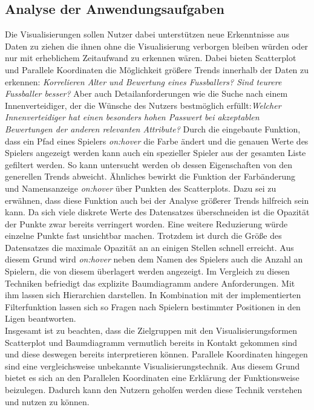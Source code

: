 \documentclass[usegeometry=true]{scrartcl}
\begin{document}
\subsection{Analyse der Anwendungsaufgaben}
Die Visualisierungen sollen Nutzer dabei unterstützen neue Erkenntnisse aus Daten zu ziehen die ihnen ohne die Visualisierung verborgen bleiben würden oder nur mit erheblichem Zeitaufwand zu erkennen wären.
Dabei bieten Scatterplot und Parallele Koordinaten die Möglichkeit größere Trends innerhalb der Daten zu erkennen: \textit{Korrelieren Alter und Bewertung eines Fussballers? Sind teurere Fussballer besser?}
Aber auch Detailanforderungen wie die Suche nach einem Innenverteidiger, der die Wünsche des Nutzers bestmöglich erfüllt:\textit{Welcher Innenverteidiger hat einen besonders hohen Passwert bei akzeptablen Bewertungen der anderen relevanten Attribute?}
Durch die eingebaute Funktion, dass ein Pfad eines Spielers \textit{on:hover} die Farbe ändert und die genauen Werte des Spielers angezeigt werden kann auch ein spezieller Spieler aus der gesamten Liste gefiltert werden. So kann untersucht werden ob dessen Eigenschaften von den generellen Trends abweicht.
Ähnliches bewirkt die Funktion der Farbänderung und Namensanzeige \textit{on:hover} über Punkten des Scatterplots.
Dazu sei zu erwähnen, dass diese Funktion auch bei der Analyse größerer Trends hilfreich sein kann. Da sich viele diskrete Werte des Datensatzes überschneiden ist die Opazität der Punkte zwar bereits verringert worden. Eine weitere Reduzierung würde einzelne Punkte fast unsichtbar machen. Trotzdem ist durch die Größe des Datensatzes die maximale Opazität an an einigen Stellen schnell erreicht. Aus diesem Grund wird \textit{on:hover} neben dem Namen des Spielers auch die Anzahl an Spielern, die von diesem überlagert werden angezeigt. 
Im Vergleich zu diesen Techniken befriedigt das explizite Baumdiagramm andere Anforderungen. Mit ihm lassen sich Hierarchien darstellen. In Kombination mit der implementierten Filterfunktion lassen sich so Fragen nach Spielern bestimmter Positionen in den Ligen beantworten.\\

Insgesamt ist zu beachten, dass die Zielgruppen mit den Visualisierungsformen Scatterplot und Baumdiagramm vermutlich bereits in Kontakt gekommen sind und diese deswegen bereits interpretieren können. Parallele Koordinaten hingegen sind eine vergleichsweise unbekannte Visualisierungstechnik. Aus diesem Grund bietet es sich an den Parallelen Koordinaten eine Erklärung der Funktionsweise beizulegen. Dadurch kann den Nutzern geholfen werden diese Technik verstehen und nutzen zu können.
\end{document}
